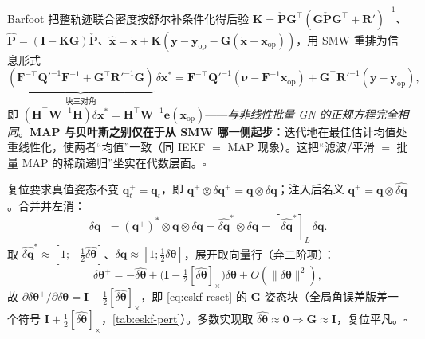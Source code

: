 \begin{derivation}
Barfoot\cite{barfoot2024state} 把整轨迹联合密度按舒尔补条件化得后验 $\mathbf{K}=\check{\mathbf{P}}\mathbf{G}^\top(\mathbf{G}\check{\mathbf{P}}\mathbf{G}^\top+\mathbf{R}')^{-1}$、$\hat{\mathbf{P}}=(\mathbf{I}-\mathbf{K}\mathbf{G})\check{\mathbf{P}}$、$\hat{\mathbf{x}}=\check{\mathbf{x}}+\mathbf{K}(\mathbf{y}-\mathbf{y}_{\text{op}}-\mathbf{G}(\check{\mathbf{x}}-\mathbf{x}_{\text{op}}))$，用 SMW 重排为信息形式
\[
  \underbrace{(\mathbf{F}^{-\top}\mathbf{Q}'^{-1}\mathbf{F}^{-1}+\mathbf{G}^\top\mathbf{R}'^{-1}\mathbf{G})}_{\text{块三对角}}\,\delta\mathbf{x}^*=\mathbf{F}^{-\top}\mathbf{Q}'^{-1}(\boldsymbol{\nu}-\mathbf{F}^{-1}\mathbf{x}_{\text{op}})+\mathbf{G}^\top\mathbf{R}'^{-1}(\mathbf{y}-\mathbf{y}_{\text{op}}),
\]
即 $(\mathbf{H}^\top\mathbf{W}^{-1}\mathbf{H})\delta\mathbf{x}^*=\mathbf{H}^\top\mathbf{W}^{-1}\mathbf{e}(\mathbf{x}_{\text{op}})$——\emph{与非线性批量 GN 的正规方程完全相同}。\textbf{MAP 与贝叶斯之别仅在于从 SMW 哪一侧起步}：迭代地在最佳估计均值处重线性化，使两者“均值”一致（同 IEKF $=$ MAP 现象）。这把“滤波/平滑 $=$ 批量 MAP 的稀疏递归”坐实在代数层面。\hfill$\square$
\end{derivation}

\begin{derivation}
复位要求真值姿态不变 $\mathbf{q}_t^+=\mathbf{q}_t$，即 $\mathbf{q}^+\otimes\delta\mathbf{q}^+=\mathbf{q}\otimes\delta\mathbf{q}$；注入后名义 $\mathbf{q}^+=\mathbf{q}\otimes\widehat{\delta\mathbf{q}}$。合并并左消：
\[
  \delta\mathbf{q}^+=(\mathbf{q}^+)^*\otimes\mathbf{q}\otimes\delta\mathbf{q}=\widehat{\delta\mathbf{q}}^*\otimes\delta\mathbf{q}=[\widehat{\delta\mathbf{q}}^*]_L\,\delta\mathbf{q}.
\]
取 $\widehat{\delta\mathbf{q}}^*\approx[1;-\tfrac12\widehat{\delta\boldsymbol{\theta}}]$、$\delta\mathbf{q}\approx[1;\tfrac12\delta\boldsymbol{\theta}]$，展开取向量行（弃二阶项）：
\[
  \delta\boldsymbol{\theta}^+=-\widehat{\delta\boldsymbol{\theta}}+\Big(\mathbf{I}-\tfrac12[\widehat{\delta\boldsymbol{\theta}}]_\times\Big)\delta\boldsymbol{\theta}+O(\|\delta\boldsymbol{\theta}\|^2),
\]
故 $\partial\delta\boldsymbol{\theta}^+/\partial\delta\boldsymbol{\theta}=\mathbf{I}-\tfrac12[\widehat{\delta\boldsymbol{\theta}}]_\times$，即 \cref{eq:eskf-reset} 的 $\mathbf{G}$ 姿态块\cite{sola2017quaternion}（全局角误差版差一个符号 $\mathbf{I}+\tfrac12[\widehat{\delta\boldsymbol{\theta}}]_\times$，\cref{tab:eskf-pert}）。多数实现取 $\widehat{\delta\boldsymbol{\theta}}\approx\mathbf{0}\Rightarrow\mathbf{G}\approx\mathbf{I}$，复位平凡。\hfill$\square$
\end{derivation}

